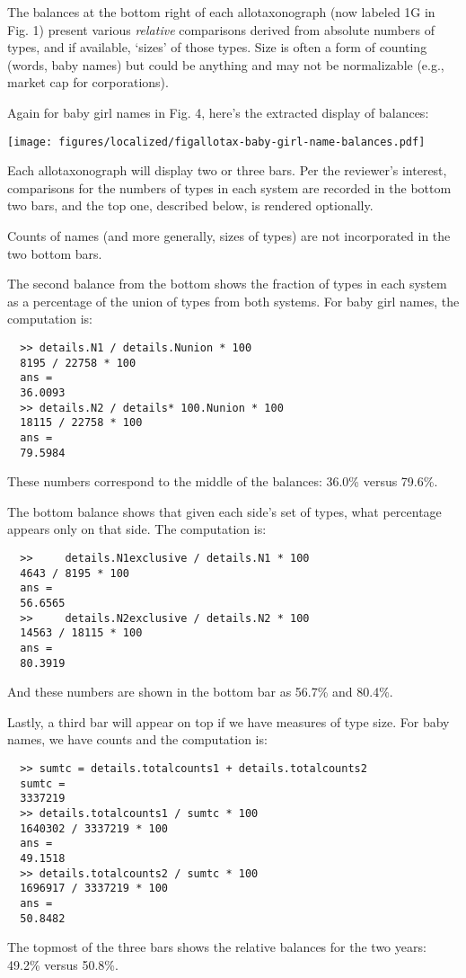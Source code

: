 The balances at the bottom right of each allotaxonograph
(now labeled 1G in Fig. 1) present various
\textit{relative} comparisons derived from absolute numbers of types,
and if available, `sizes' of those types.
Size is often a form of counting (words, baby names) but could
be anything and may not be normalizable (e.g., market cap for corporations).

Again for baby girl names in Fig. 4, here's the extracted display of balances:
\begin{center}
  \texttt{[image: figures/localized/figallotax-baby-girl-name-balances.pdf]}
\end{center}

Each allotaxonograph will display two or three bars.
Per the reviewer's interest,
comparisons for the numbers of types in each system
are recorded in the bottom two bars,
and the top one, described below, is rendered optionally.

Counts of names (and more generally, sizes of types)
are not incorporated in the two bottom bars.

The second balance from the bottom shows the fraction of types in each system
as a percentage of the union of types from both systems.
For baby girl names, the computation is:
\begin{lstlisting}
  >> details.N1 / details.Nunion * 100 
  8195 / 22758 * 100
  ans =
  36.0093
  >> details.N2 / details* 100.Nunion * 100 
  18115 / 22758 * 100
  ans =
  79.5984
\end{lstlisting}
These numbers correspond to the middle of the balances: 36.0\% versus 79.6\%.

The bottom balance shows that given each side's set of types,
what percentage appears only on that side.
The computation is:
\begin{lstlisting}
  >>     details.N1exclusive / details.N1 * 100
  4643 / 8195 * 100
  ans =
  56.6565
  >>     details.N2exclusive / details.N2 * 100
  14563 / 18115 * 100
  ans =
  80.3919
\end{lstlisting}
And these numbers are shown in the bottom bar as 56.7\% and 80.4\%.

Lastly, a third bar will appear on top if we have measures of type size.
For baby names, we have counts and the computation is:
\begin{lstlisting}
  >> sumtc = details.totalcounts1 + details.totalcounts2  
  sumtc =
  3337219
  >> details.totalcounts1 / sumtc * 100                  
  1640302 / 3337219 * 100
  ans =
  49.1518
  >> details.totalcounts2 / sumtc * 100
  1696917 / 3337219 * 100
  ans =
  50.8482
\end{lstlisting}
The topmost of the three bars shows the relative balances for the two years:
49.2\% versus 50.8\%.

